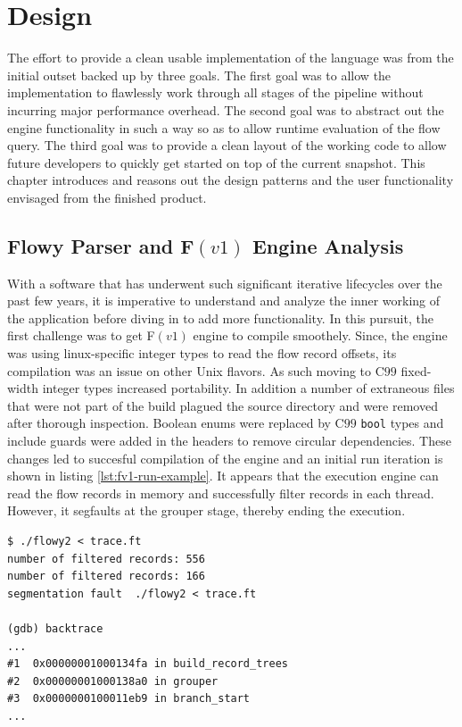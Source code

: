 \chapter{Design}\label{ch:design}

The effort to provide a clean usable implementation of the language was from
the initial outset backed up by three goals. The first goal was to allow the
implementation to flawlessly work through all stages of the pipeline without
incurring major performance overhead. The second goal was to abstract out the
engine functionality in such a way so as to allow runtime evaluation of the
flow query. The third goal was to provide a clean layout of the working code
to allow future developers to quickly get started on top of the current
snapshot. This chapter introduces and reasons out the design patterns and
the user functionality envisaged from the finished product.


\section{Flowy Parser and F$(v1)$ Engine Analysis}\label{sec:adt-workflow}
With a software that has underwent such significant iterative lifecycles over
the past few years, it is imperative to understand and analyze the inner
working of the application before diving in to add more functionality. In this
pursuit, the first challenge was to get F$(v1)$ engine to compile smoothely.
Since, the engine was using linux-specific integer types to read the flow
record  offsets, its compilation was
an issue on other Unix flavors. As such moving to C$99$ \cite{c99:1999}
fixed-width integer types increased portability. In addition a number of
extraneous files that were not part of the build plagued the source directory
and were removed after thorough inspection. Boolean enums were replaced by
C$99$ \texttt{bool} types and include guards were added in the headers to
remove circular dependencies. These changes led to succesful compilation of
the engine and an initial run iteration is shown in listing
\ref{lst:fv1-run-example}. It appears that the execution engine can read the
flow records in memory and successfully filter records in each thread.
However, it segfaults at the grouper stage, thereby ending the execution.

\begin{lstlisting}
$ ./flowy2 < trace.ft
number of filtered records: 556
number of filtered records: 166
segmentation fault  ./flowy2 < trace.ft

(gdb) backtrace
...
#1  0x00000001000134fa in build_record_trees
#2  0x00000001000138a0 in grouper
#3  0x0000000100011eb9 in branch_start
...
\end{lstlisting}


